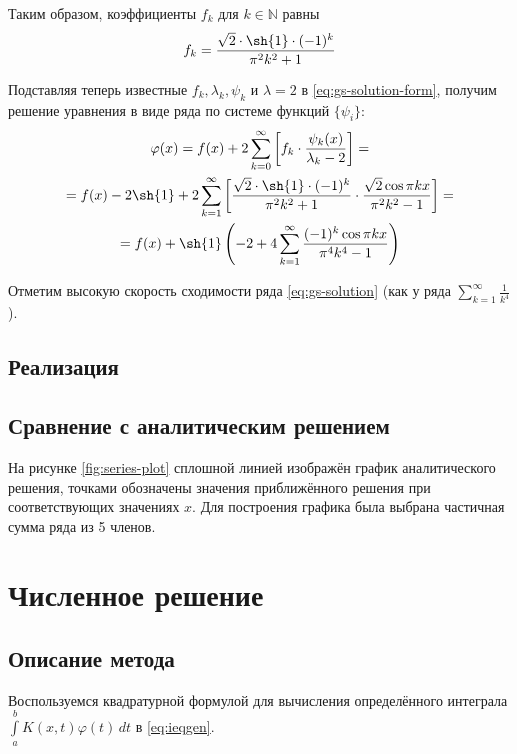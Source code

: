 \documentclass{article}
\numberwithin{equation}{section}
\renewcommand{\phi}{\varphi}
\newcommand{\intl}{\int\limits}
\providecommand{\set}[1]{\mathbb{#1}}
\begin{document}
Таким образом, коэффициенты $f_k$ для $k \in \set{N}$ равны
\begin{equation}
  f_k = \frac{\sqrt{2} \cdot \sh{1}\cdot (-1)^k}{\pi^2 k^2 + 1}
\end{equation}

Подставляя теперь известные $f_k, \lambda_k, \psi_k$ и $\lambda = 2$ в
\eqref{eq:gs-solution-form}, получим решение уравнения в виде ряда по
системе функций $\{\psi_i\}$:
\begin{multline}
  \label{eq:gs-solution}
  \phi(x) = f(x) + 2 \sum_{k=0}^\infty \left [
    f_k\cdot\frac{\psi_k(x)}{\lambda_k-2} \right ] = \\
  = f(x) - 2 \sh{1} + 2 \sum_{k=1}^\infty\left [ \frac{\sqrt{2} \cdot
      \sh{1}\cdot (-1)^k}{\pi^2 k^2 + 1} \cdot \frac{\sqrt{2}\cos{\pi
        k x}}{\pi^2 k^2 - 1} \right ] = \\
  = f(x) + \sh{1} \left ( -2 + 4  \sum_{k=1}^\infty \frac{(-1)^k
      \cos{\pi k x}} {\pi^4 k^4 - 1} \right )
\end{multline}

Отметим высокую скорость сходимости ряда \eqref{eq:gs-solution} (как у
ряда $\sum \limits_{k=1}^\infty \frac{1}{k^4}$).

\subsection{Реализация}
\label{sec:gs-implementation}



\subsection{Сравнение с аналитическим решением}

На рисунке \ref{fig:series-plot} сплошной линией изображён график
аналитического решения, точками обозначены значения приближённого
решения при соответствующих значениях $x$. Для построения графика была
выбрана частичная сумма ряда из 5 членов.




\clearpage
\section{Численное решение}
\label{sec:numeric}
\subsection{Описание метода}
Воспользуемся квадратурной формулой для вычисления определённого
интеграла $\intl_a^b {K(x, t) \phi(t)\,dt}$ в \eqref{eq:ieqgen}.
\end{document}
